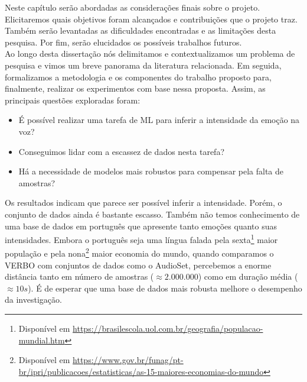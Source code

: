 
Neste capítulo serão abordadas as considerações finais sobre o projeto. Elicitaremos quais objetivos foram alcançados e contribuições que o projeto traz. Também serão levantadas as dificuldades encontradas e as limitações desta pesquisa. Por fim, serão elucidados os possíveis trabalhos futuros.\\

Ao longo desta dissertação nós delimitamos e contextualizamos um problema de pesquisa e vimos um breve panorama da literatura relacionada. Em seguida, formalizamos a metodologia e os componentes do trabalho proposto para, finalmente, realizar os experimentos com base nessa proposta. Assim, as principais questões exploradas foram:


\begin{itemize}
    \item É possível realizar uma tarefa de \acrshort{ML} para inferir a intensidade da emoção na voz?
    \item Conseguimos lidar com a escassez de dados nesta tarefa?
    \item Há a necessidade de modelos mais robustos para compensar pela falta de amostras?
\end{itemize}


Os resultados indicam que parece ser possível inferir a intensidade. Porém, o conjunto de dados ainda é bastante escasso. Também não temos conhecimento de uma base de dados em português que apresente tanto emoções quanto suas intensidades. Embora o português seja uma língua falada pela sexta\footnote{Disponível em \url{https://brasilescola.uol.com.br/geografia/populacao-mundial.htm}} maior população e pela nona\footnote{Disponível em \url {https://www.gov.br/funag/pt-br/ipri/publicacoes/estatisticas/as-15-maiores-economias-do-mundo}} maior economia do mundo, quando comparamos o VERBO com conjuntos de dados como o AudioSet, percebemos a enorme distância tanto em número de amostras ($\approx 2.000.000$) como em duração média ($\approx 10s$). É de esperar que uma base de dados mais robusta melhore o desempenho da investigação.


